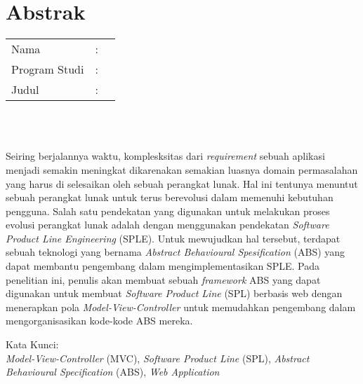 %
%
%

\chapter*{Abstrak}

\vspace*{0.2cm}

\noindent \begin{tabular}{l l p{10cm}}
	Nama&: & \penulis \\
	Program Studi&: & \program \\
	Judul&: & \judul \\
\end{tabular} \\ 

\vspace*{0.5cm}

\noindent 
\\ Seiring berjalannya waktu, komplesksitas dari \textit{requirement} sebuah aplikasi menjadi semakin meningkat dikarenakan semakian luasnya domain permasalahan yang harus di selesaikan oleh sebuah perangkat lunak. Hal ini tentunya menuntut sebuah perangkat lunak untuk terus berevolusi dalam memenuhi kebutuhan pengguna. Salah satu pendekatan yang digunakan untuk melakukan proses evolusi perangkat lunak adalah dengan menggunakan pendekatan \textit{Software Product Line Engineering} (SPLE). Untuk mewujudkan hal tersebut, terdapat sebuah teknologi yang bernama \textit{Abstract Behavioural Spesification} (ABS) yang dapat membantu pengembang dalam mengimplementasikan SPLE. Pada penelitian ini, penulis akan membuat sebuah \textit{framework} ABS yang dapat digunakan untuk membuat \textit{Software Product Line} (SPL) berbasis web dengan menerapkan pola \textit{Model-View-Controller} untuk memudahkan pengembang dalam mengorganisasikan kode-kode ABS mereka.

\vspace*{0.2cm}

\noindent Kata Kunci: \\ 
\noindent \textit{Model-View-Controller} (MVC), \textit{Software Product Line} (SPL), \textit{Abstract Behavioural Specification} (ABS), \textit{Web Application}\\ 

\newpage
